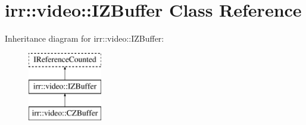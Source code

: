 \hypertarget{classirr_1_1video_1_1_i_z_buffer}{\section{irr\-:\-:video\-:\-:I\-Z\-Buffer Class Reference}
\label{classirr_1_1video_1_1_i_z_buffer}
}
Inheritance diagram for irr\-:\-:video\-:\-:I\-Z\-Buffer\-:\begin{figure}[H]
\begin{center}
\leavevmode
\includegraphics[height=3.000000cm]{classirr_1_1video_1_1_i_z_buffer}
\end{center}
\end{figure}
